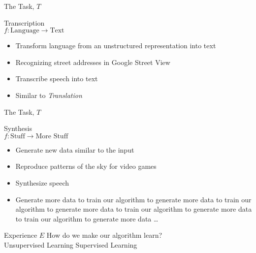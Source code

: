 \begin{slide}{The Task, $T$}
  \begin{center}
    {\Large
    Transcription}\\
    \vspace{0.3cm}
    $f: \text{Language} \rightarrow \text{Text}$
  \end{center}
  \begin{itemize}
    \pause\item Transform language from an unstructured representation into text
    \pause\item Recognizing street addresses in Google Street View
    \pause\item Transcribe speech into text
    \pause\item Similar to \emph{Translation} %
  \end{itemize}
\end{slide}

\begin{slide}{The Task, $T$}
  \begin{center}{
    \Large
    Synthesis}\\
    \vspace{0.3cm}
    $f: \text{Stuff} \rightarrow \text{More Stuff}$
  \end{center}
  \begin{itemize}
    \pause\item Generate new data similar to the input
    \pause\item Reproduce patterns of the sky for video games
    \pause\item Synthesize speech %
    \pause\item Generate more data to train our algorithm to generate more data to train our algorithm to generate more data to train our algorithm to generate more data to train our algorithm to generate more data \dots
  \end{itemize}
\end{slide}

\begin{slide}{Experience $E$}
  \centering
  {\LARGE How do we make our algorithm learn?}\\
  \vspace{1.3cm}
  \large
  \pause Unsupervised Learning %
  \hspace{1cm}
  \pause Supervised Learning %
\end{slide}
